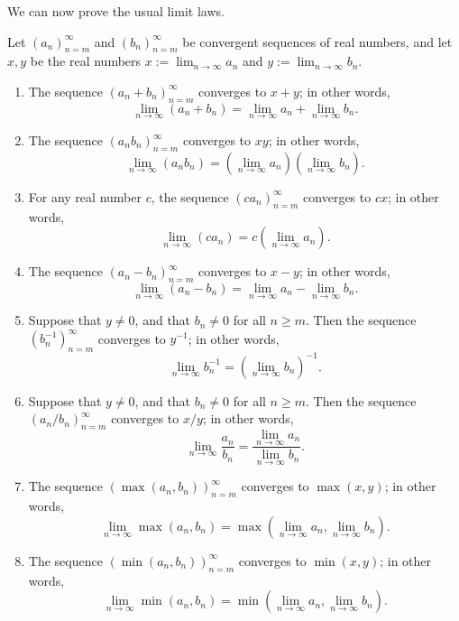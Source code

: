 We can now prove the usual limit laws.
\begin{theorem}  \label{thm 6.1.19}
Let \((a_n)_{n = m}^\infty\) and \((b_n)_{n = m}^\infty\) be convergent sequences of real numbers, and let \(x, y\) be the real numbers \(x := \lim_{n \to \infty} a_n\) and \(y := \lim_{n \to \infty} b_n\).
\begin{enumerate}
\item
    The sequence \((a_n + b_n)_{n = m}^\infty\) converges to \(x + y\);
    in other words,
    \[
        \lim_{n \to \infty} (a_n + b_n) = \lim_{n \to \infty} a_n + \lim_{n \to \infty} b_n.
    \]
\item
    The sequence \((a_n b_n)_{n = m}^\infty\) converges to \(xy\);
    in other words,
    \[
        \lim_{n \to \infty} (a_n b_n) = (\lim_{n \to \infty} a_n)(\lim_{n \to \infty} b_n).
    \]
\item
    For any real number \(c\), the sequence \((c a_n)_{n = m}^\infty\) converges to \(cx\);
    in other words,
    \[
        \lim_{n \to \infty} (c a_n) = c(\lim_{n \to \infty} a_n).
    \]
\item
    The sequence \((a_n - b_n)_{n = m}^\infty\) converges to \(x - y\);
    in other words,
    \[
        \lim_{n \to \infty} (a_n - b_n) = \lim_{n \to \infty} a_n - \lim_{n \to \infty} b_n.
    \]
\item
    Suppose that \(y \neq 0\), and that \(b_n \neq 0\) for all \(n \geq m\).
    Then the sequence \((b_n^{-1})_{n = m}^\infty\) converges to \(y^{-1}\);
    in other words,
    \[
        \lim_{n \to \infty} b_n^{-1} = (\lim_{n \to \infty} b_n)^{-1}.
    \]
\item
    Suppose that \(y \neq 0\), and that \(b_n \neq 0\) for all \(n \geq m\).
    Then the sequence \((a_n / b_n)_{n = m}^\infty\) converges to \(x / y\);
    in other words,
    \[
        \lim_{n \to \infty} \frac{a_n}{b_n} = \frac{\lim_{n \to \infty} a_n}{\lim_{n \to \infty} b_n}.
    \]
\item
    The sequence \((\max(a_n, b_n))_{n = m}^\infty\) converges to \(\max(x, y)\);
    in other words,
    \[
        \lim_{n \to \infty} \max(a_n, b_n) = \max(\lim_{n \to \infty} a_n, \lim_{n \to \infty} b_n).
    \]
\item
    The sequence \((\min(a_n, b_n))_{n = m}^\infty\) converges to \(\min(x, y)\);
    in other words,
    \[
        \lim_{n \to \infty} \min(a_n, b_n) = \min(\lim_{n \to \infty} a_n, \lim_{n \to \infty} b_n).
    \]
\end{enumerate}
\end{theorem}

